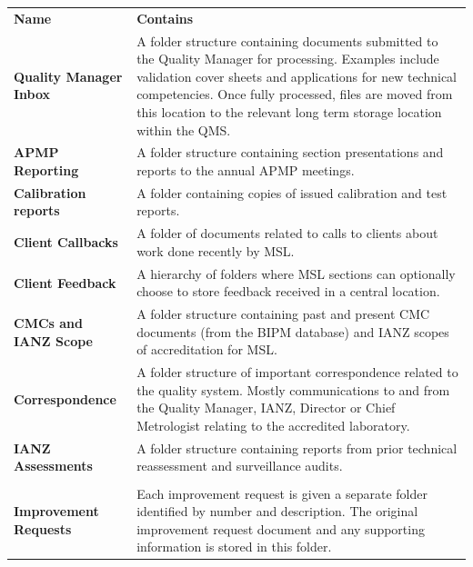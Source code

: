 {\renewcommand*{\arraystretch}{1.4}
\begin{longtable}{p{14.07em}p{25em}}
	\rowcolor[rgb]{ 0,  0,  0} 
	\textcolor[rgb]{ 1,  1,  1}{\textbf{Name}} & 
	\textcolor[rgb]{ 1,  1,  1}{\textbf{Contains}} \\

\textbf{Quality Manager Inbox} & A folder structure containing documents submitted to the Quality Manager for processing.  Examples include validation cover sheets and applications for new technical competencies.  Once fully processed, files are moved from this location to the relevant long term storage location within the QMS. \\

\textbf{APMP Reporting} & A folder structure containing section presentations and reports to the annual APMP meetings. \\

\textbf{Calibration reports} & A folder containing copies of issued calibration and test reports. \\

\textbf{Client Callbacks} & A folder of documents related to calls to clients about work done recently by MSL. \\

\textbf{Client Feedback} & A hierarchy of folders where MSL sections can optionally choose to store feedback received in a central location. \\

\textbf{CMCs and IANZ Scope} & A folder structure containing past and present CMC documents (from the BIPM database) and IANZ scopes of accreditation for MSL. \\

\textbf{Correspondence} & A folder structure of important correspondence related to the quality system. Mostly communications to and from the Quality Manager, IANZ, Director or Chief Metrologist relating to the accredited laboratory. \\

\textbf{IANZ Assessments} & A folder structure containing reports from prior technical reassessment and surveillance audits. \\

\\

\textbf{Improvement Requests} & Each improvement request is given a separate folder identified by number and description.  The original improvement request document and any supporting information is stored in this folder. \\


\end{longtable}}
